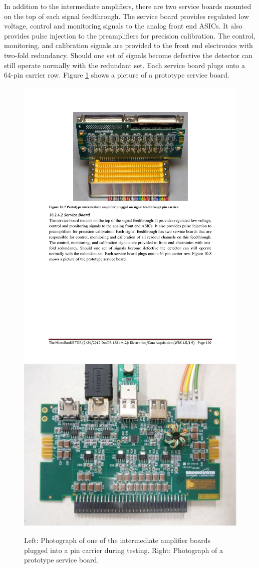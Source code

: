 In addition to the intermediate amplifiers, there are two service boards mounted on the top of each signal feedthrough. The service board provides regulated low voltage, control and monitoring signals to the analog front end ASICs. It also provides pulse injection to the preamplifiers for precision calibration. The control, monitoring, and calibration signals are provided to the front end electronics with two-fold redundancy. Should one set of signals become defective the detector can still operate normally with the redundant set. Each service board plugs onto a 64-pin carrier row. Figure \ref{fig:intermediateamplifier} shows a picture of a prototype service board.

\begin{figure}
\begin{center}
\includegraphics[width=0.4\linewidth]{figures/intermediate_amplifier.pdf}
\includegraphics[width=0.4\linewidth]{figures/serviceboard.pdf}
\end{center}
\caption{\label{fig:intermediateamplifier}Left: Photograph of one of the intermediate amplifier boards plugged into a pin carrier during testing.  Right: Photograph of a prototype service board.}
\end{figure}


